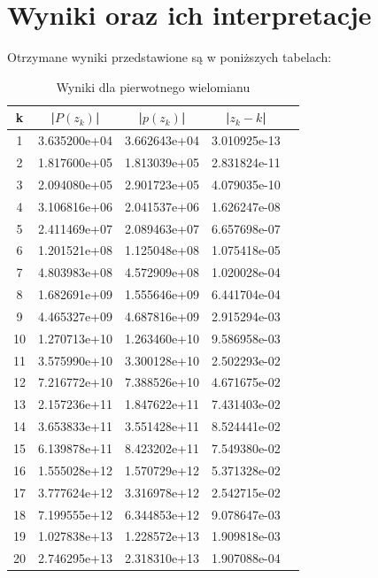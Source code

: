\documentclass[a4paper,14pt]{report}
\begin{document}
  \section{Wyniki oraz ich interpretacje}
    Otrzymane wyniki przedstawione są w poniższych tabelach:

    \begin{table}[H]
    \centering
    \begin{tabular}{|c | c | c | c | c |} 
     \hline
     k & |$P(z_{k})$| & |$p(z_{k})$| & |$z_{k}-k$| \\ [0.5ex] 
     \hline\hline
     1 & 3.635200e+04 & 3.662643e+04 & 3.010925e-13 \\
     2 & 1.817600e+05 & 1.813039e+05 & 2.831824e-11 \\
     3 & 2.094080e+05 & 2.901723e+05 & 4.079035e-10 \\
     4 & 3.106816e+06 & 2.041537e+06 & 1.626247e-08 \\
     5 & 2.411469e+07 & 2.089463e+07 & 6.657698e-07 \\
     6 & 1.201521e+08 & 1.125048e+08 & 1.075418e-05 \\
     7 & 4.803983e+08 & 4.572909e+08 & 1.020028e-04 \\
     8 & 1.682691e+09 & 1.555646e+09 & 6.441704e-04 \\
     9 & 4.465327e+09 & 4.687816e+09 & 2.915294e-03 \\
     10 & 1.270713e+10 & 1.263460e+10 & 9.586958e-03 \\
     11 & 3.575990e+10 & 3.300128e+10 & 2.502293e-02 \\
     12 & 7.216772e+10 & 7.388526e+10 & 4.671675e-02 \\
     13 & 2.157236e+11 & 1.847622e+11 & 7.431403e-02 \\
     14 & 3.653833e+11 & 3.551428e+11 & 8.524441e-02 \\
     15 & 6.139878e+11 & 8.423202e+11 & 7.549380e-02 \\
     16 & 1.555028e+12 & 1.570729e+12 & 5.371328e-02 \\
     17 & 3.777624e+12 & 3.316978e+12 & 2.542715e-02 \\
     18 & 7.199555e+12 & 6.344853e+12 & 9.078647e-03 \\
     19 & 1.027838e+13 & 1.228572e+13 & 1.909818e-03 \\
     20 & 2.746295e+13 & 2.318310e+13 & 1.907088e-04 \\
     \hline
    \end{tabular}
    \caption{Wyniki dla pierwotnego wielomianu}
    \label{Zad3Random}
    \end{table}
\end{document}
